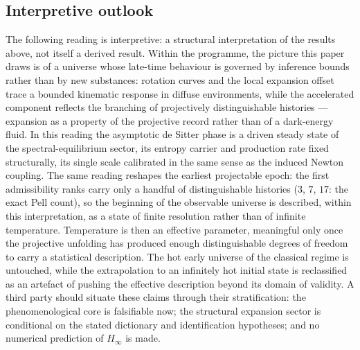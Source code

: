 \subsection*{Interpretive outlook}
  The following reading is interpretive: a structural interpretation of the results above, not itself a
  derived result.
  Within the programme, the picture this paper draws is of a universe whose late-time behaviour is governed
  by inference bounds rather than by new substances: rotation curves and the local expansion offset trace a
  bounded kinematic response in diffuse environments, while the accelerated component reflects the branching
  of projectively distinguishable histories --- expansion as a property of the projective record rather than
  of a dark-energy fluid.
  In this reading the asymptotic de Sitter phase is a driven steady state of the spectral-equilibrium
  sector, its entropy carrier and production rate fixed structurally, its single scale calibrated in the
  same sense as the induced Newton coupling.
  The same reading reshapes the earliest projectable epoch: the first admissibility ranks carry only a
  handful of distinguishable histories ($3$, $7$, $17$: the exact Pell count), so the beginning of the
  observable universe is described, within this interpretation, as a state of finite resolution rather
  than of infinite temperature.
  Temperature is then an effective parameter, meaningful only once the projective unfolding has produced
  enough distinguishable degrees of freedom to carry a statistical description.
  The hot early universe of the classical regime is untouched, while the extrapolation to an infinitely
  hot initial state is reclassified as an artefact of pushing the effective description beyond its domain
  of validity.
  A third party should situate these claims through their stratification: the phenomenological core is
  falsifiable now; the structural expansion sector is conditional on the stated dictionary and
  identification hypotheses; and no numerical prediction of $H_\infty$ is made.
